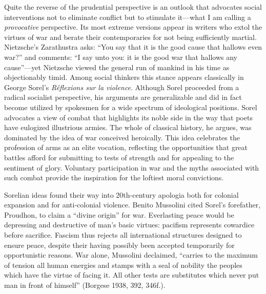 Quite the reverse of the prudential perspective is an outlook that advocates social interventions not to eliminate conflict but to stimulate it---what I am calling a \emph{provocative} perspective. Its most extreme versions appear in writers who extol the virtues of war and berate their contemporaries for not being sufficiently martial. Nietzsche's Zarathustra asks: ``You say that it is the good cause that hallows even war?'' and comments: ``I say unto you: it is the good war that hallows any cause''---yet Nietzsche viewed the general run of mankind in his time as objectionably timid. Among social thinkers this stance appears classically in George Sorel's \emph{R\'{e}flexions sur la violence}. Although Sorel proceeded from a radical socialist perspective, his arguments are generalizable and did in fact become utilized by spokesmen for a wide spectrum of ideological positions. Sorel advocates a view of combat that highlights its noble side in the way that poets have eulogized illustrious armies. The whole of classical history, he argues, was dominated by the idea of war conceived heroically. This idea celebrates the profession of arms as an elite vocation, reflecting the opportunities that great battles afford for submitting to tests of strength and for appealing to the sentiment of glory. Voluntary participation in war and the myths associated with such combat provide the inspiration for the loftiest moral convictions. 

Sorelian ideas found their way into 20th-century apologia both for colonial expansion and for anti-colonial violence. Benito Mussolini cited Sorel's forefather, Proudhon, to claim a ``divine origin'' for war. Everlasting peace would be depressing and destructive of man's basic virtues: pacifism represents cowardice before sacrifice. Fascism thus rejects all international structures designed to ensure peace, despite their having possibly been accepted temporarily for opportunistic reasons. War alone, Mussolini declaimed, ``carries to the maximum of tension all human energies and stamps with a seal of nobility the peoples which have the virtue of facing it. All other tests are substitutes which never put man in front of himself'' (Borgese 1938, 392, 346f.). 

